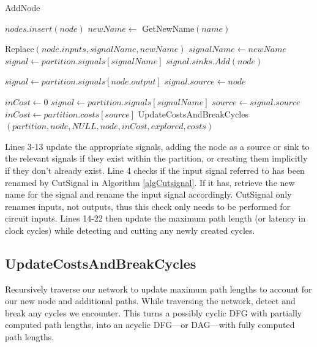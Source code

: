 \documentclass[12pt,final,oneside]{dwThesis} %
\begin{document}
\begin{algorithm}
\begin{center}
      \end{center}

      \caption{AddNode}\label{addnode} 
      \begin{algorithmic}[1]
         \State $nodes.insert(node)$
           
         \State
         $newName \gets$ GetNewName$(name)$ 

         \State Replace$(node.inputs, signalName, newName)$  
         \State $signalName
         \gets newName$ \EndIf 
         \State $signal \gets
         partition.signals[signalName]$ 
         \State $signal.sinks.Add(node)$ \EndFor

         \State $signal \gets partition.signals[node.output]$ 
         \State
         $signal.source \gets node$


         \State $inCost \gets 0$  
         \State
         $signal \gets partition.signals[signalName]$ 
         \State $source \gets
         signal.source$  
         \State $inCost
         \gets partition.costs[source]$ \EndIf \EndFor 
         \State
         UpdateCostsAndBreakCycles$(partition, node, NULL, node, inCost,
         explored, costs)$ \EndProcedure 
      \end{algorithmic}

   \end{algorithm}

   Lines 3-13 update the appropriate signals, adding the node as a source or
   sink to the relevant signals if they exist within the partition, or creating them implicitly if they don't already exist.
   Line 4 checks if the input signal referred to has been renamed by CutSignal in Algorithm \ref{algCutsignal}.
   If it has, retrieve the new name for the signal and rename the input signal accordingly.
   CutSignal only renames inputs, not outputs, thus this check only needs to be performed for circuit inputs.
   Lines 14-22 then update the maximum path length (or latency in
   clock cycles) while detecting and cutting any newly created cycles.


   \newpage 
   \subsection{UpdateCostsAndBreakCycles}
   Recursively traverse our
   network to update maximum path lengths to account for our new node and
   additional paths. While traversing the network, detect and break any cycles
   we encounter.  This turns a possibly cyclic \gls{DFG} with partially
   computed path lengths, into an acyclic \gls{DFG}---or \gls{DAG}---with fully computed path
   lengths.
\end{document}
